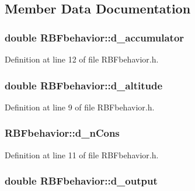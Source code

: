 \subsection{Member Data Documentation}
\hypertarget{class_r_b_fbehavior_a275688a12adb637bfb849f26b20df538}{
\subsubsection[{d\_\-accumulator}]{\setlength{\rightskip}{0pt plus 5cm}double {\bf RBFbehavior::d\_\-accumulator}}}
\label{class_r_b_fbehavior_a275688a12adb637bfb849f26b20df538}


Definition at line 12 of file RBFbehavior.h.

\hypertarget{class_r_b_fbehavior_a831ab08f316756149ff37a92098f7033}{
\subsubsection[{d\_\-altitude}]{\setlength{\rightskip}{0pt plus 5cm}double {\bf RBFbehavior::d\_\-altitude}}}
\label{class_r_b_fbehavior_a831ab08f316756149ff37a92098f7033}


Definition at line 9 of file RBFbehavior.h.

\hypertarget{class_r_b_fbehavior_aee0030c63fc36e3cb5ffac67dbaa77d5}{
\subsubsection[{d\_\-nCons}]{ {\bf RBFbehavior::d\_\-nCons}}}
\label{class_r_b_fbehavior_aee0030c63fc36e3cb5ffac67dbaa77d5}


Definition at line 11 of file RBFbehavior.h.

\hypertarget{class_r_b_fbehavior_a73826fb24b1ef473ea546babbb4bdbd2}{
\subsubsection[{d\_\-output}]{\setlength{\rightskip}{0pt plus 5cm}double {\bf RBFbehavior::d\_\-output}}}
\label{class_r_b_fbehavior_a73826fb24b1ef473ea546babbb4bdbd2}



